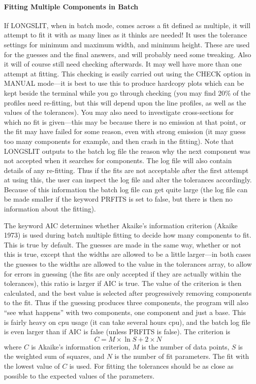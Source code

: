 \paragraph{Fitting Multiple Components in Batch}
\label{long.mb}

If LONGSLIT, when in batch mode, comes across a fit defined as multiple,
it will attempt to fit it with as many lines as it thinks are needed!
It uses the tolerance settings for minimum and maximum width, and
minimum height.
These are used for the guesses and the final answers, and will probably
need some tweaking.
Also it will of course still need checking afterwards.
It may well have more than one attempt at fitting. This checking is
easily carried out using the CHECK option in MANUAL mode---it
is best to use this to produce hardcopy plots which can be kept beside
the terminal while you go through checking (you may find 20\% of the
profiles need re-fitting, but this will depend upon the line profiles,
as well as the values of the tolerances). You may also need to
investigate cross-sections for which no fit is given---this may be
because there is no emission at that point, or the fit may have failed
for some reason, even with strong emission (it may guess too many
components for example, and then crash in the fitting).
Note that LONGSLIT outputs to the batch log file the reason why the next
component was not accepted when it searches for components. The log file
will also contain details of any re-fitting.
Thus if the fits are not acceptable after the first attempt at using
this, the user can inspect the log file and alter the tolerances
accordingly.
Because of this information the batch log file can get quite large (the
log file can be made smaller if the keyword PRFITS is set to false, but
there is then no information about the fitting).

The keyword AIC determines whether Akaike's information criterion
(Akaike 1973) is used during batch multiple fitting to decide how many
components to fit.
This is true by default.
The guesses are made in the same way, whether or not this is true,
except that the widths are allowed to be a little larger---in both cases
the guesses to the widths are allowed to the value in the tolerances
array, to allow for errors in guessing (the fits are only accepted if
they are actually within the tolerances), this  ratio is larger if AIC
is true.
The value of the criterion is then calculated, and the best value is
selected after progressively removing components to the fit.
Thus if the guessing produces three components, the program will also
``see what happens'' with two components, one component and just a base.
This is fairly heavy on cpu usage (it can take several hours cpu), and
the batch log file is even larger than if AIC is false (unless PRFITS is
false).
The criterion is
\[
C = M \times \ln S + 2 \times N
\]
where $C$ is Akaike's information criterion, $M$ is the number of data
points, $S$ is the weighted sum of squares, and $N$ is the number of fit
parameters.
The fit with the lowest value of $C$ is used.
For fitting the tolerances should be as close as possible to the
expected values of the parameters.


